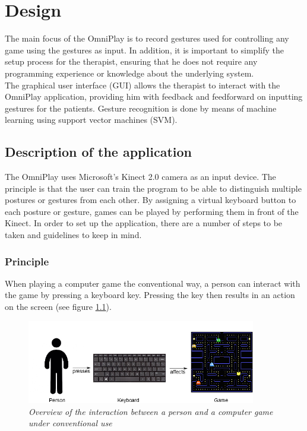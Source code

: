 \chapter{Design}
\label{chapter: design}

The main focus of the OmniPlay is to record gestures used for controlling any game using the gestures as input. In addition, it is important to simplify the setup process for the therapist, ensuring that he does not require any programming experience or knowledge about the underlying system.\\

The graphical user interface (GUI) allows the therapist to interact with the OmniPlay application, providing him with feedback and feedforward on inputting gestures for the patients. Gesture recognition is done by means of machine learning using support vector machines (SVM).


\section{Description of the application}

The OmniPlay uses Microsoft's Kinect 2.0 camera as an input device. The principle is that the user can train the program to be able to distinguish multiple postures or gestures from each other. By assigning a virtual keyboard button to each posture or gesture, games can be played by performing them in front of the Kinect. In order to set up the application, there are a number of steps to be taken and guidelines to keep in mind.


\subsection{Principle}

When playing a computer game the conventional way, a person can interact with the game by pressing a keyboard key. Pressing the key then results in an action on the screen (see figure \ref{fig: overview_basic_interaction}).\\

\begin{figure}[H]
\begin{center}
\includegraphics[width=10cm]{Concept1.png}
\caption{\emph{Overview of the interaction between a person and a computer game under conventional use}}
\label{fig: overview_basic_interaction}
\end{center}
\end{figure}

